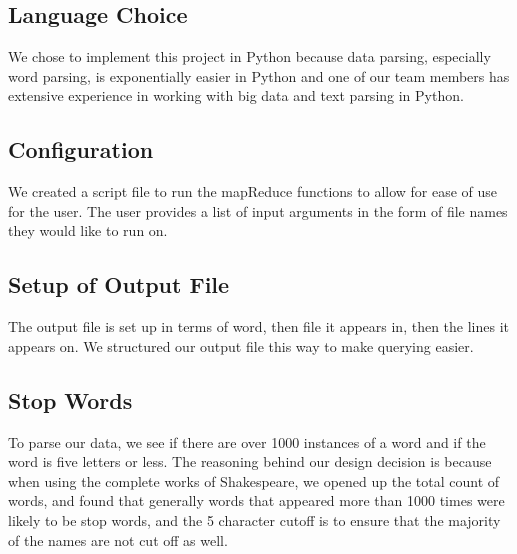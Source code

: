 

    \subsection{Language Choice}
    We chose to implement this project in Python because data parsing, especially word parsing, is exponentially easier in Python and one of our team members has extensive experience in working with big data and text parsing in Python.
    \subsection{Configuration}
    We created a script file to run the mapReduce functions to allow for ease of use for the user. The user provides a list of input arguments in the form of file names they would like to run on. 
    \subsection{Setup of Output File}
    The output file is set up in terms of word, then file it appears in, then the lines it appears on. We structured our output file this way to make querying easier.
    \subsection{Stop Words}
    To parse our data, we see if there are over 1000 instances of a word and if the word is five letters or less. The reasoning behind our design decision is because when using the complete works of Shakespeare, we opened up the total count of words, and found that generally words that appeared more than 1000 times were likely to be stop words, and the 5 character cutoff is to ensure that the majority of the names are not cut off as well. 